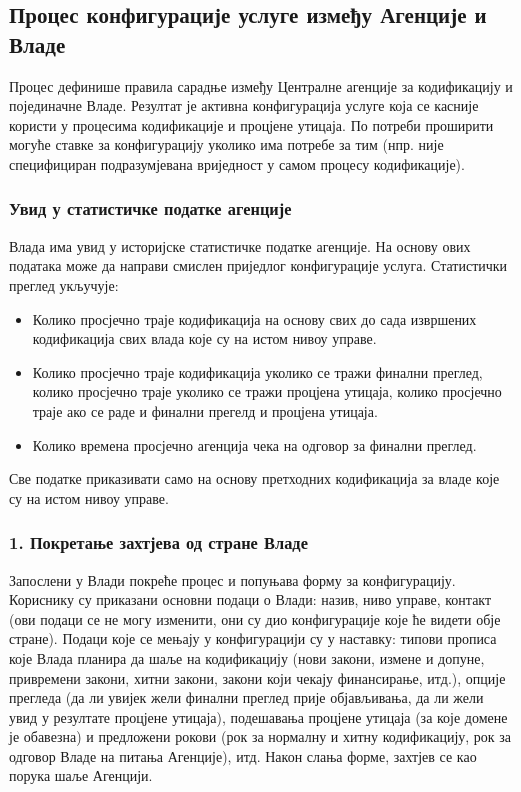 \documentclass[12pt,a4paper]{article}
\newcommand{\bonus}[1]{\textcolor{emerald}{#1}}
\begin{document}
\subsection{Процес конфигурације услуге између Агенције и Владе}

Процес дефинише правила сарадње између Централне агенције за кодификацију и појединачне Владе. Резултат је активна конфигурација услуге која се касније користи у процесима кодификације и процјене утицаја. По потреби проширити могуће ставке за конфигурацију уколико има потребе за тим (нпр. није специфициран подразумјевана вриједност у самом процесу кодификације).

\subsubsection{Увид у статистичке податке агенције}

\bonus{Влада има увид у историјске статистичке податке агенције. На основу ових података може да направи смислен приједлог конфигурације услуга. Статистички преглед укључује:}

\begin{itemize}
    \item \bonus{Колико просјечно траје кодификација на основу свих до сада извршених кодификација свих влада које су на истом нивоу управе.}
    \item \bonus{Колико просјечно траје кодификација уколико се тражи финални преглед, колико просјечно траје уколико се тражи процјена утицаја, колико просјечно траје ако се раде и финални прегелд и процјена утицаја.}
    \item \bonus{Колико времена просјечно агенција чека на одговор за финални преглед.}
\end{itemize}
\bonus{Све податке приказивати само на основу претходних кодификација за владе које су на истом нивоу управе.}

\subsubsection{1. Покретање захтјева од стране Владе}

Запослени у Влади покреће процес и попуњава форму за конфигурацију. Кориснику су приказани основни подаци о Влади: назив, ниво управе, контакт (ови подаци се не могу изменити, они су дио конфигурације које ће видети обје стране). Подаци које се мењају у конфигурацији су у наставку: типови прописа које Влада планира да шаље на кодификацију (нови закони, измене и допуне, привремени закони, хитни закони, закони који чекају финансирање, итд.), опције прегледа (да ли увијек жели финални преглед прије објављивања, да ли жели увид у резултате процјене утицаја), подешавања процјене утицаја (за које домене је обавезна) и предложени рокови (рок за нормалну и хитну кодификацију, рок за одговор Владе на питања Агенције), итд. Након слања форме, захтјев се као порука шаље Агенцији.
\end{document}
